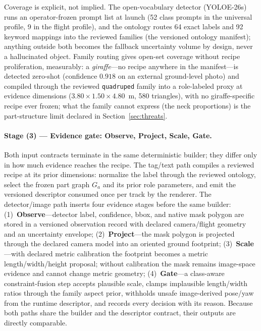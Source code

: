 \documentclass[11pt,a4paper]{article}
\begin{document}
Coverage is explicit, not implied. The open-vocabulary detector
(YOLOE-26s) runs an operator-frozen prompt list at launch (52 class prompts
in the universal profile, 9 in the flight profile), and the ontology routes
64 exact labels and 92 keyword mappings into the reviewed families
(the versioned ontology manifest); anything outside both becomes the fallback
uncertainty volume by design, never a hallucinated object. Family routing
gives open-set coverage without recipe proliferation, measurably: a
\emph{giraffe}---no recipe anywhere in the manifest---is detected zero-shot
(confidence \(0.918\) on an external ground-level photo) and compiled
through the reviewed \texttt{quadruped} family into a role-labeled proxy at
evidence dimensions (\(3.80\times1.50\times4.80\)~m, 580 triangles), with no
giraffe-specific recipe ever frozen; what the family cannot express (the
neck proportions) is the part-structure limit declared in
Section~\ref{sec:threats}.

\paragraph{Stage (3) --- Evidence gate: Observe, Project, Scale, Gate.}
\label{sec:pipeline}
Both input contracts terminate in the same deterministic builder; they differ
only in how much evidence reaches the recipe. The tag/text path compiles a
reviewed recipe at its prior dimensions: normalize the label through the
reviewed ontology, select the frozen part graph \(G_a\) and its prior role
parameters, and emit the versioned descriptor consumed once
per track by the renderer. The detector/image path inserts four evidence
stages before the same builder: (1)~\textbf{Observe}---detector label,
confidence, bbox, and native mask polygon are stored in a
versioned observation record with declared camera/flight geometry and an
uncertainty envelope; (2)~\textbf{Project}---the mask polygon
is projected through the declared camera model into an oriented ground
footprint; (3)~\textbf{Scale}---with declared metric calibration the
footprint becomes a metric length/width/height proposal; without calibration
the mask remains image-space evidence and cannot change metric geometry;
(4)~\textbf{Gate}---a class-aware constraint-fusion step accepts plausible
scale, clamps implausible length/width ratios through the family aspect prior,
withholds unsafe image-derived pose/yaw from the runtime descriptor, and
records every decision with its reason. Because both paths share the builder
and the descriptor contract, their outputs are directly comparable.
\end{document}
